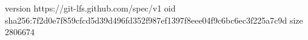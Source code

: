 version https://git-lfs.github.com/spec/v1
oid sha256:7f2d0e7f859cfcd5d39d496fd352f987ef1397f8eee04f9c6bc6ec3f225a7c9d
size 2806674
